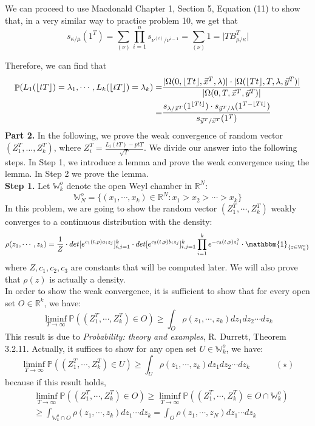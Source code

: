 \documentclass[12pt]{article}
\DeclareMathOperator{\pr}{\mathbb{P}}
\DeclarePairedDelimiter\floor{\lfloor}{\rfloor}
\begin{document}
We can proceed to use Macdonald Chapter 1, Section 5, Equation (11) to show that, in a very similar way to practice problem 10, we get that 
\[s_{\kappa/\mu}(1^T)=\sum_{(\nu)}\prod_{i=1}^n s_{\nu^{(i)}/\nu^{i-1}}=\sum_{(\nu)} 1=\lvert TB_{\mu/\kappa}^T\rvert\]

Therefore, we can find that 
\begin{align*}
\pr(L_1(\lfloor tT\rfloor)=\lambda_1,\cdots, L_k(\lfloor tT\rfloor)=\lambda_k)
=&{}\frac{\lvert \Omega(0,\lfloor Tt\rfloor, \vec{x}^T, \lambda)\rvert\cdot \lvert \Omega(\lfloor Tt\rfloor ,T, \lambda, \vec{y}^T)\rvert}{\lvert \Omega(0, T, \vec{x}^T, \vec{y}^T)\rvert}\\
=&{}\frac{s_{\lambda/\vec{x}^T}(1^{\floor{Tt}})\cdot s_{\vec{y}^T/\lambda}(1^{T-\floor{Tt}})}{s_{\vec{y}^T/\vec{x}^T}(1^T)}
\end{align*}
\textbf{Part 2. } In the following, we prove the weak convergence of random vector $(Z_{1}^{T},\dots,Z_{k}^{T})$, where $Z_{i}^{T}=\frac{L_{i}(tT)-ptT}{\sqrt{T}}$. We divide our answer into the following steps. In Step 1, we introduce a lemma and prove the weak convergence using the lemma. In Step 2 we prove the lemma.\\
\textbf{Step 1. }Let $\mathbb{W}_{k}^{o}$ denote the open Weyl chamber in $\mathbb{R}^{N}$:
$$\mathbb{W}_{N}^{o}=\{(x_{1},\cdots,x_{k})\in\mathbb{R}^{N}:x_{1}>x_{2}>\cdots>x_{k}\}$$ 
In this problem, we are going to show the random vector $(Z_{1}^{T},\cdots,Z_{k}^{T})$ weakly converges to a continuous distribution with the density:
$$\rho(z_{1},\cdots,z_{k})=\frac{1}{Z}\cdot det[e^{c_1(t,p)a_{i}z_{j}}]_{i,j=1}^{k}\cdot det[e^{c_2(t,p)b_{i}z_{j}}]_{i,j=1}^{k}\prod_{i=1}^{k}e^{-c_{3}(t,p)z_{i}^{2}}\cdot \mathbbm{1}_{\{z\in \mathbb{W}_{k}^{o}\}}$$
where $Z,c_{1},c_{2},c_{3}$ are constants that will be computed later. We will also prove that $\rho(z)$ is actually a density.\\
In order to show the weak convergence, it is sufficient to show that for every open set $O\in\mathbb{R}^{k}$, we have: 
$$\liminf_{T\rightarrow\infty}\mathbb{P}((Z_{1}^{T},\cdots,Z_{k}^{T})\in O)\geqslant\int_{O}\rho(z_{1},\cdots,z_{k})dz_{1}dz_{2}\cdots dz_{k}$$
This result is due to \emph{Probability: theory and examples}, R. Durrett, Theorem 3.2.11. Actually, it suffices to show for any open set $U\in\mathbb{W}_{k}^{o}$, we have:
$$\liminf_{T\rightarrow\infty}\mathbb{P}((Z_{1}^{T},\cdots,Z_{k}^{T})\in U)\geqslant\int_{U}\rho(z_{1},\cdots,z_{k})dz_{1}dz_{2}\cdots dz_{k}\quad\quad\quad (\star)$$
because if this result holds,
\begin{align*}
	&\liminf_{T\rightarrow\infty}\mathbb{P}((Z_{1}^{T},\cdots,Z_{k}^{T})\in O)\geqslant\liminf_{T\rightarrow\infty}\mathbb{P}((Z_{1}^{T},\cdots,Z_{k}^{T})\in O\cap\mathbb{W}_{k}^{o})\\
	&\geqslant \int_{\mathbb{W}_{k}^{o}\cap O}\rho(z_{1},\cdots,z_{k})dz_{1}\cdots dz_{k}= \int_{O}\rho(z_{1},\cdots,z_{N})dz_{1}\cdots dz_{k}
\end{align*}
\end{document}
